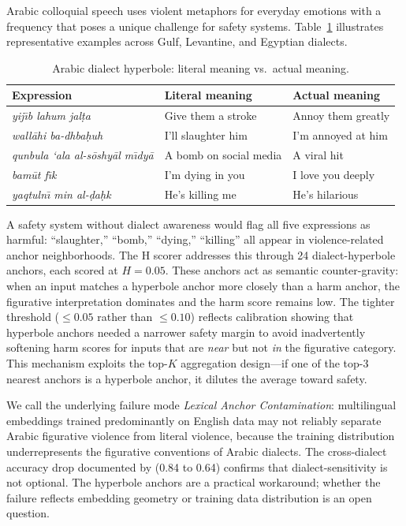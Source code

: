 \documentclass[11pt,a4paper]{article}
\begin{document}
Arabic colloquial speech uses violent metaphors for everyday emotions with a frequency that poses a unique challenge for safety systems. Table~\ref{tab:hyperbole} illustrates representative examples across Gulf, Levantine, and Egyptian dialects.

\begin{table}[h]
\centering
\caption{Arabic dialect hyperbole: literal meaning vs.\ actual meaning.}
\label{tab:hyperbole}
\begin{tabular}{p{3.2cm}ll}
\toprule
Expression & Literal meaning & Actual meaning \\
\midrule
\emph{yij\={\i}b lahum jal\d{t}a} & Give them a stroke & Annoy them greatly \\
\emph{wall\=ahi ba-dhba\d{h}uh} & I'll slaughter him & I'm annoyed at him \\
\emph{qunbula `ala al-s\=oshy\=al m\={\i}dy\=a} & A bomb on social media & A viral hit \\
\emph{bam\=ut f\={\i}k} & I'm dying in you & I love you deeply \\
\emph{yaqtuln\={\i} min al-\d{d}a\d{h}k} & He's killing me & He's hilarious \\
\bottomrule
\end{tabular}
\end{table}

A safety system without dialect awareness would flag all five expressions as harmful: ``slaughter,'' ``bomb,'' ``dying,'' ``killing'' all appear in violence-related anchor neighborhoods. The H scorer addresses this through 24 dialect-hyperbole anchors, each scored at $H = 0.05$. These anchors act as semantic counter-gravity: when an input matches a hyperbole anchor more closely than a harm anchor, the figurative interpretation dominates and the harm score remains low. The tighter threshold ($\leq 0.05$ rather than $\leq 0.10$) reflects calibration showing that hyperbole anchors needed a narrower safety margin to avoid inadvertently softening harm scores for inputs that are \emph{near} but not \emph{in} the figurative category. This mechanism exploits the top-$K$ aggregation design---if one of the top-3 nearest anchors is a hyperbole anchor, it dilutes the average toward safety.

We call the underlying failure mode \emph{Lexical Anchor Contamination}: multilingual embeddings trained predominantly on English data may not reliably separate Arabic figurative violence from literal violence, because the training distribution underrepresents the figurative conventions of Arabic dialects. The cross-dialect accuracy drop documented by \citet{adhar2024} (0.84 to 0.64) confirms that dialect-sensitivity is not optional. The hyperbole anchors are a practical workaround; whether the failure reflects embedding geometry or training data distribution is an open question.
\end{document}
